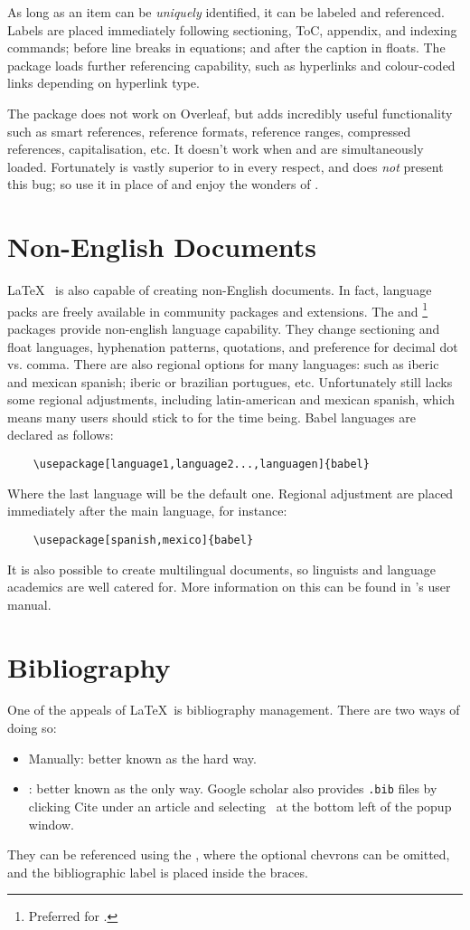 As long as an item can be \emph{uniquely} identified, it can be
labeled and referenced.  Labels are placed immediately following
sectioning, ToC, appendix, and indexing commands; before line breaks
in equations; and after the caption in floats.  The 
package loads further referencing capability, such as hyperlinks and
colour-coded links depending on hyperlink type.

The package  does not work on Overleaf, but adds
incredibly useful functionality such as smart references, reference
formats, reference ranges, compressed references, capitalisation, etc.
It doesn't work when  and  are
simultaneously loaded.  Fortunately  is vastly
superior to  in every respect, and does \emph{not}
present this bug; so use it in place of  and enjoy the
wonders of .
%
\section{Non-English Documents}
%
\LaTeX~ is also capable of creating non-English documents.  In fact,
language packs are freely available in community packages and
extensions.  The  and
\footnote{Preferred for \XeLaTeX.} packages provide
non-english language capability.  They change sectioning and float
languages, hyphenation patterns, quotations, and preference for
decimal dot vs. comma.  There are also regional options for many
languages: such as iberic and mexican spanish; iberic or brazilian
portugues, etc.  Unfortunately  still lacks some
regional adjustments, including latin-american and mexican spanish,
which means many users should stick to  for the time
being.  Babel languages are declared as follows:
\begin{verbatim}
	\usepackage[language1,language2...,languagen]{babel}
\end{verbatim}
Where the last language will be the default one.  Regional adjustment
are placed immediately after the main language, for instance:
\begin{verbatim}
	\usepackage[spanish,mexico]{babel}
\end{verbatim}

It is also possible to create multilingual documents, so linguists and
language academics are well catered for.  More information on this can
be found in 's user manual.
%
\section{Bibliography}
%
One of the appeals of \LaTeX~is bibliography management.  There are
two ways of doing so:
\begin{itemize}
\item Manually: better known as the hard way.
\item \BibTeX: better known as the only way.  Google scholar also
  provides \texttt{.bib} files by clicking Cite under an article and
  selecting \BibTeX~at the bottom left of the popup window.
\end{itemize}
They can be referenced using the , where the optional
chevrons can be omitted, and the bibliographic label is placed inside
the braces.
%
